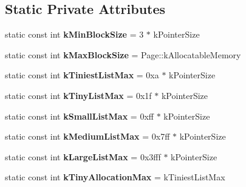 \subsection*{Static Private Attributes}
\begin{DoxyCompactItemize}
\item 
static const int {\bfseries k\+Min\+Block\+Size} = 3 $\ast$ k\+Pointer\+Size\hypertarget{classv8_1_1internal_1_1_free_list_aa58aafa661898388649bc3fcf6988ee3}{}\label{classv8_1_1internal_1_1_free_list_aa58aafa661898388649bc3fcf6988ee3}

\item 
static const int {\bfseries k\+Max\+Block\+Size} = Page\+::k\+Allocatable\+Memory\hypertarget{classv8_1_1internal_1_1_free_list_a7144b81ac8481ddcbee45ef835cb9514}{}\label{classv8_1_1internal_1_1_free_list_a7144b81ac8481ddcbee45ef835cb9514}

\item 
static const int {\bfseries k\+Tiniest\+List\+Max} = 0xa $\ast$ k\+Pointer\+Size\hypertarget{classv8_1_1internal_1_1_free_list_afdb656af14984fd3587020a9f7801230}{}\label{classv8_1_1internal_1_1_free_list_afdb656af14984fd3587020a9f7801230}

\item 
static const int {\bfseries k\+Tiny\+List\+Max} = 0x1f $\ast$ k\+Pointer\+Size\hypertarget{classv8_1_1internal_1_1_free_list_a81c5ccbc1daace65840f643105e7b7a5}{}\label{classv8_1_1internal_1_1_free_list_a81c5ccbc1daace65840f643105e7b7a5}

\item 
static const int {\bfseries k\+Small\+List\+Max} = 0xff $\ast$ k\+Pointer\+Size\hypertarget{classv8_1_1internal_1_1_free_list_a830eb20c2feea2d9f1291e225f84aafc}{}\label{classv8_1_1internal_1_1_free_list_a830eb20c2feea2d9f1291e225f84aafc}

\item 
static const int {\bfseries k\+Medium\+List\+Max} = 0x7ff $\ast$ k\+Pointer\+Size\hypertarget{classv8_1_1internal_1_1_free_list_ae41eca615f7670eeb3f52717eb846c14}{}\label{classv8_1_1internal_1_1_free_list_ae41eca615f7670eeb3f52717eb846c14}

\item 
static const int {\bfseries k\+Large\+List\+Max} = 0x3fff $\ast$ k\+Pointer\+Size\hypertarget{classv8_1_1internal_1_1_free_list_aa45cd1010d785d2911a6b7a810675810}{}\label{classv8_1_1internal_1_1_free_list_aa45cd1010d785d2911a6b7a810675810}

\item 
static const int {\bfseries k\+Tiny\+Allocation\+Max} = k\+Tiniest\+List\+Max\hypertarget{classv8_1_1internal_1_1_free_list_a22fc014c9a33fa5d1fc4b799abeece21}{}\label{classv8_1_1internal_1_1_free_list_a22fc014c9a33fa5d1fc4b799abeece21}


\end{DoxyCompactItemize}
